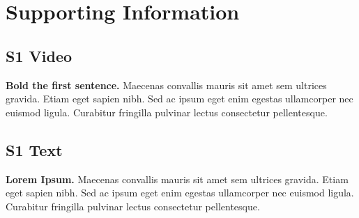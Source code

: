 \documentclass[10pt,a4paper]{article}  %
\begin{document}


\section*{Supporting Information}

\subsection*{S1 Video}
\label{S1_Video}
{\bf Bold the first sentence.}  Maecenas convallis mauris sit amet sem ultrices gravida. Etiam eget sapien nibh. Sed ac ipsum eget enim egestas ullamcorper nec euismod ligula. Curabitur fringilla pulvinar lectus consectetur pellentesque.

\subsection*{S1 Text}
\label{S1_Text}
{\bf Lorem Ipsum.} Maecenas convallis mauris sit amet sem ultrices gravida. Etiam eget sapien nibh. Sed ac ipsum eget enim egestas ullamcorper nec euismod ligula. Curabitur fringilla pulvinar lectus consectetur pellentesque.
\end{document}
